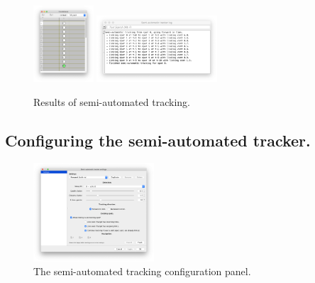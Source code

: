 \begin{figure}
    \centering
    \null\hfill
    \includegraphics[width=0.2\textwidth]{figures/Mastodon_SemiAutoTracking_02.png}
    \hfill
    \includegraphics[width=0.4\textwidth]{figures/Mastodon_SemiAutoTracking_03.png}
    \hfill\null
    \caption{Results of semi-automated tracking.}
    \label{fig:AfterSemiAutoTracking}
\end{figure}


\subsection{Configuring the semi-automated tracker.}

\begin{figure}
    \centering
    \includegraphics[width=0.4\textwidth]{figures/Mastodon_SemiAutoTracking_04.png}
    \caption{The semi-automated tracking configuration panel.}
    \label{fig:ConfigSemiAutoTracking}
\end{figure}

